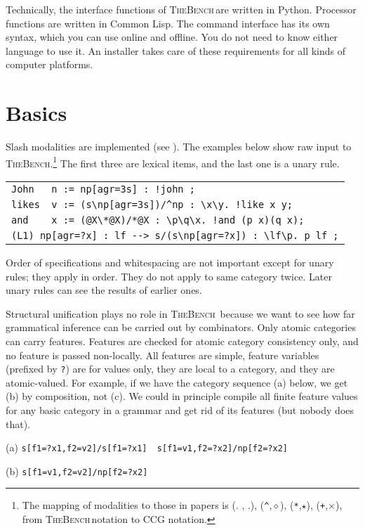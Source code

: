 \documentclass[11pt]{article}
\newcommand{\tool}{\textsc{TheBench}}
\begin{document}
Technically, the interface functions of \tool\,are written in Python. Processor functions are written in Common Lisp. The command
interface has its own syntax, which you can use online and offline. You do not need to know either language to use it. An installer takes care of these requirements for all kinds of computer platforms.

\section{Basics}\label{sec:basics}
Slash modalities are implemented (see \citealt{baldridge02,steedmanbaldridge-guide}). The examples below show raw input to \tool.\footnote{The mapping of modalities
to those in papers is (. , .), (\verb|^|,$\diamond$), (\verb|*|,$\star$), (\verb|+|,$\times$), from \tool\,notation to CCG notation.} 
The first three are lexical items, { and the last one is a unary  rule}. 


\begin{tabular}{l}
\verb|John   n := np[agr=3s] : !john ;|\\ 
\verb|likes  v := (s\np[agr=3s])/^np : \x\y. !like x y;|\\
\verb|and    x := (@X\*@X)/*@X : \p\q\x. !and (p x)(q x);|\\
\verb|(L1) np[agr=?x] : lf --> s/(s\np[agr=?x]) : \lf\p. p lf ;|
\end{tabular}\medskip

\noindent Order of specifications and whitespacing are not important {except for unary rules; they apply in order. They do
not apply to same category twice}.  {Later unary rules can see the results of earlier ones.}

Structural unification plays no role in \tool\, because we want to see how far grammatical inference can be carried out by combinators. 
Only atomic categories can carry features.
Features are checked for
atomic category consistency only, and no feature is passed non-locally. All features are simple, feature variables (prefixed by \verb+?+) are
for values only, they are local to a category, and they are atomic-valued. For example, if we have the category sequence (a) below, we get
(b) by composition, not (c). We could in principle compile all finite feature values for any basic category in a grammar and get rid of its features (but nobody does that). 

(a) \verb|s[f1=?x1,f2=v2]/s[f1=?x1]  s[f1=v1,f2=?x2]/np[f2=?x2]|

(b) \verb|s[f1=v1,f2=v2]/np[f2=?x2]|
\end{document}
